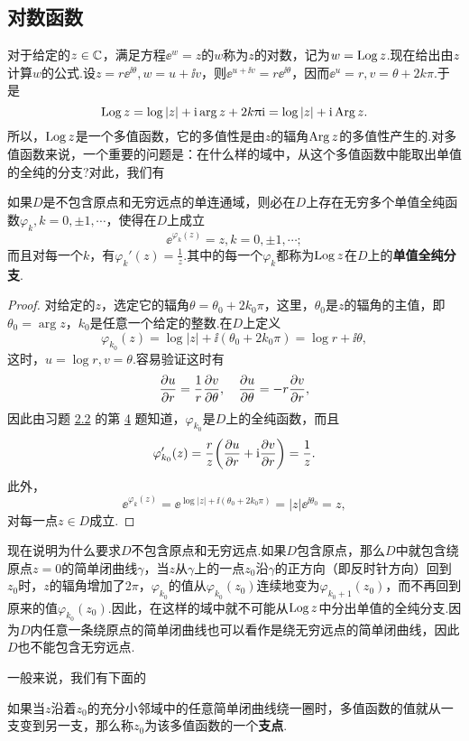 \subsection{对数函数}
对于给定的$z\in \mathbb C$，满足方程$\ee^w=z$的$w$称为$z$的对数，记为$w=\operatorname{Log} z$.现在给出由$z$计算$w$的公式.设$z=r\ee^{\ii\theta},w=u+\ii v$，则$\ee^{u+\ii v}=r\ee^{\ii\theta}$，因而$\ee^u=r,v=\theta+2k\pi$.于是
\[
  \operatorname{Log} z = \log|z| + \mathrm i\arg z + 2k\uppi\mathrm i = \log|z| + \mathrm i\operatorname{Arg} z.
\]
所以，$\operatorname{Log} z$是一个多值函数，它的多值性是由$z$的辐角$\operatorname{Arg} z$的多值性产生的.对多值函数来说，一个重要的问题是：在什么样的域中，从这个多值函数中能取出单值的全纯的分支?对此，我们有
\begin{theorem}\label{thm2.4.2}
  如果$D$是不包含原点和无穷远点的单连通域，则必在$D$上存在无穷多个单值全纯函数$\varphi_k,k=0,\pm1,\cdots$，使得在$D$上成立
  \[
    \ee^{\varphi_k(z)} = z, k = 0, \pm1 , \cdots;
  \]
  而且对每一个$k$，有$\varphi_k'(z)=\frac1z$.其中的每一个$\varphi_k$都称为$\operatorname{Log} z$在$D$上的\textbf{单值全纯分支}.
\end{theorem}
\begin{proof}
  对给定的$z$，选定它的辐角$\theta=\theta_0+2k_0\pi$，这里，$\theta_0$是$z$的辐角的主值，即$\theta_0=\arg z$，$k_0$是任意一个给定的整数.在$D$上定义
  \[
    \varphi_{k_0}(z) = \log|z| + \ii(\theta_0+2k_0\pi) = \log r + \ii\theta,
  \]
  这时，$u=\log r,v=\theta$.容易验证这时有
  \[
    \frac{\partial u}{\partial r} = \frac1r \frac{\partial v}{\partial \theta},\quad \frac{\partial u}{\partial \theta} = -r\frac{\partial v}{\partial r},
  \]
  因此由习题 \hyperlink{xiti2.2}{2.2} 的第 \hyperlink{xiti2.2.4}{4} 题知道，$\varphi_{k_0}$是$D$上的全纯函数，而且
  \[
    \varphi_{k_0}'(z) = \frac rz\bigg(\frac{\partial u}{\partial r} + \mathrm i\frac{\partial v}{\partial r}\bigg) = \frac1z.
  \]
  此外，
  \[
    \ee^{\varphi_k(z)} = \ee^{\log|z| + \ii(\theta_0 + 2k_0\pi)} = |z|\ee^{\ii\theta_0} = z,
  \]
  对每一点$z\in D$成立.
\end{proof}

现在说明为什么要求$D$不包含原点和无穷远点.如果$D$包含原点，那么$D$中就包含绕原点$z=0$的简单闭曲线$\gamma$，当$z$从$\gamma$上的一点$z_0$沿$\gamma$的正方向（即反时针方向）回到$z_0$时，$z$的辐角增加了$2\pi$，$\varphi_{k_0}$的值从$\varphi_{k_0}(z_0)$连续地变为$\varphi_{k_0+1}(z_0)$，而不再回到原来的值$\varphi_{k_0}(z_0)$.因此，在这样的域中就不可能从$\operatorname{Log} z$中分出单值的全纯分支.因为$D$内任意一条绕原点的简单闭曲线也可以看作是绕无穷远点的简单闭曲线，因此$D$也不能包含无穷远点.

一般来说，我们有下面的
\begin{definition}\label{def2.4.3}
  如果当$z$沿着$z_0$的充分小邻域中的任意简单闭曲线绕一圈时，多值函数的值就从一支变到另一支，那么称$z_0$为该多值函数的一个\textbf{支点}.
\end{definition}

